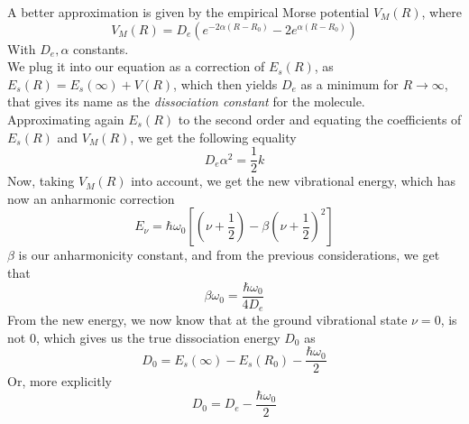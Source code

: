 \documentclass[a4paper, 11pt]{book}
\newcommand{\1}{\opr{\mathds{1}}}
\theoremstyle{plain}
\begin{document}
	A better approximation is given by the empirical Morse potential $V_M(R)$, where
	\begin{equation*}
		V_M(R)=D_e\left( e^{-2\alpha(R-R_0)}-2e^{\alpha(R-R_0)} \right)
	\end{equation*}
	With $D_e,\alpha$ constants.\\
	We plug it into our equation as a correction of $E_s(R)$, as $E_s(R)=E_s(\infty)+V(R)$, which then yields $D_e$ as a minimum for $R\to\infty$, that gives its name as the \textit{dissociation constant} for the molecule.\\
	Approximating again $E_s(R)$ to the second order and equating the coefficients of $E_s(R)$ and $V_M(R)$, we get the following equality
	\begin{equation}
		D_e\alpha^2=\frac{1}{2}k
		\label{eq:morseesequality}
	\end{equation}
	Now, taking $V_M(R)$ into account, we get the new vibrational energy, which has now an anharmonic correction
	\begin{equation}
		E_\nu=\hbar\omega_0\left[ \left( \nu+\frac{1}{2} \right)-\beta\left( \nu+\frac{1}{2} \right)^2 \right]
		\label{eq:newvibrationalenergy}
	\end{equation}
	$\beta$ is our anharmonicity constant, and from the previous considerations, we get that
	\begin{equation*}
		\beta\omega_0=\frac{\hbar\omega_0}{4D_e}
	\end{equation*}
	From the new energy, we now know that at the ground vibrational state $\nu=0$, is not $0$, which gives us the true dissociation energy $D_0$ as
	\begin{equation*}
		D_0=E_s(\infty)-E_s(R_0)-\frac{\hbar\omega_0}{2}
	\end{equation*}
	Or, more explicitly
	\begin{equation}
		D_0=D_e-\frac{\hbar\omega_0}{2}
		\label{eq:dissociationenergymolecule}
	\end{equation}
\end{document}
